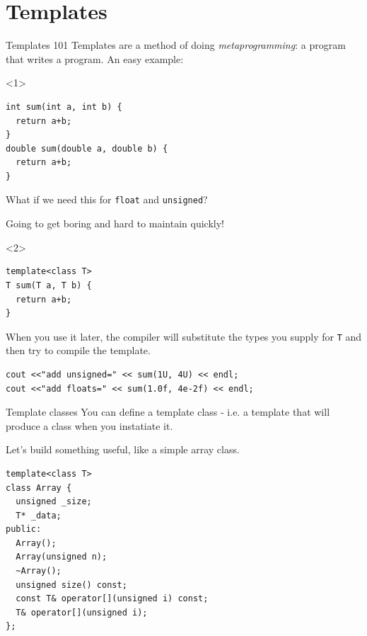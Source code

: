 \documentclass[presentation,t]{beamer}
\newcommand{\code}[1]{\lstinline!#1!}
\begin{document}
\section{Templates}
\begin{frame}[fragile]{Templates 101}
  Templates are a method of doing \emph{metaprogramming}: a program
  that writes a program.
\vfill
  An easy example:
  \begin{onlyenv}<1>
\begin{lstlisting}
int sum(int a, int b) {
  return a+b;
}
double sum(double a, double b) {
  return a+b;
}
\end{lstlisting}
    
    What if we need this for \code{float} and \code{unsigned}?
    
    Going to get boring and hard to maintain quickly!
  \end{onlyenv}

  \begin{onlyenv}<2>
\begin{lstlisting}
template<class T>
T sum(T a, T b) {
  return a+b;
}
\end{lstlisting}

    When you use it later, the compiler will substitute the types you
    supply for \code{T} and then try to compile the template.

\begin{lstlisting}
cout <<"add unsigned=" << sum(1U, 4U) << endl;
cout <<"add floats=" << sum(1.0f, 4e-2f) << endl;
\end{lstlisting}
  \end{onlyenv}
\end{frame}

\begin{frame}[fragile]{Template classes}
  You can define a template class - i.e. a template that will produce
  a class when you instatiate it.

  Let's build something useful, like a simple array class.

\begin{lstlisting}
template<class T>
class Array {
  unsigned _size;
  T* _data;
public:
  Array();
  Array(unsigned n);
  ~Array();
  unsigned size() const;
  const T& operator[](unsigned i) const;
  T& operator[](unsigned i);
};
\end{lstlisting}
\end{frame}
\end{document}

